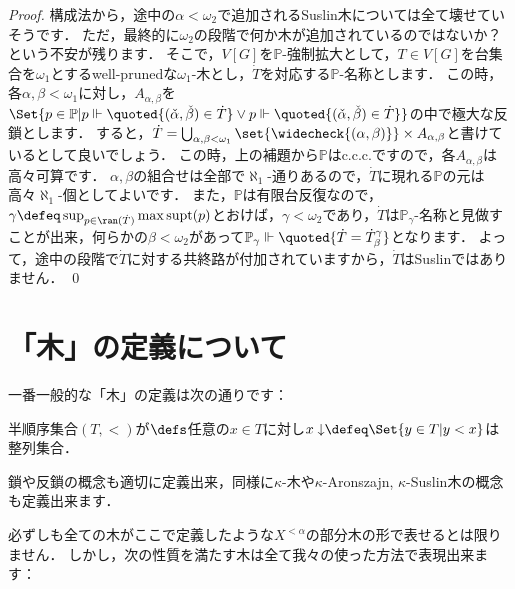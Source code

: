 \documentclass[a4j]{ltjsarticle}
\renewcommand{\emph}[1]{\textsf{\textgt{#1}}}
\begin{document}
\begin{proof}
 構成法から，途中の$\alpha < \omega_2$で追加されるSuslin木については全て壊せていそうです．
 ただ，最終的に$\omega_2$の段階で何か木が追加されているのではないか？という不安が残ります．
 そこで，$V[G]$を$\mathbb{P}$-強制拡大として，$T \in V[G]$を台集合を$\omega_1$とするwell-prunedな$\omega_1$-木とし，$\dot{T}$を対応する$\mathbb{P}$-名称とします．
 この時，各$\alpha, \beta < \omega_1$に対し，$A_{\alpha,\beta}$を$\Set{p \in \mathbb{P} | p \Vdash \quoted{(\check{\alpha}, \check{\beta}) \in \dot{T}} \lor p \Vdash \quoted{(\check{\alpha}, \check{\beta}) \in \dot{T}}}$の中で極大な反鎖とします．
 すると，$\dot{T} = \bigcup_{\alpha, \beta < \omega_1} \set{\widecheck{(\alpha, \beta)}} \times A_{\alpha,\beta}$と書けているとして良いでしょう．
 この時，上の補題から$\mathbb{P}$はc.c.c.ですので，各$A_{\alpha,\beta}$は高々可算です．
 $\alpha, \beta$の組合せは全部で$\aleph_1$-通りあるので，$\dot{T}$に現れる$\mathbb{P}$の元は高々$\aleph_1$-個としてよいです．
 また，$\mathbb{P}$は有限台反復なので，$\gamma \defeq \sup_{p \in \ran(\dot{T})} \max \mathop{\mathrm{supt}}(p)$とおけば，$\gamma < \omega_2$であり，$\dot{T}$は$\mathbb{P}_\gamma$-名称と見做すことが出来，何らかの$\beta < \omega_2$があって$\mathbb{P}_\gamma \Vdash \quoted{\dot{T} = \dot{T}^\gamma_\beta}$となります．
 よって，途中の段階で$\dot{T}$に対する共終路が付加されていますから，$\dot{T}$はSuslinではありません． \qed
\end{proof}

\section*{「木」の定義について}
一番一般的な「木」の定義は次の通りです：
\begin{definition}
 半順序集合$(T, <)$が\emph{木}$\defs$任意の$x \in T$に対し$\mathord{x\downarrow} \defeq \Set{y \in T | y < x}$は整列集合．
\end{definition}

鎖や反鎖の概念も適切に定義出来，同様に$\kappa$-木や$\kappa$-Aronszajn, $\kappa$-Suslin木の概念も定義出来ます．

必ずしも全ての木がここで定義したような$X^{<\alpha}$の部分木の形で表せるとは限りません．
しかし，次の性質を満たす木は全て我々の使った方法で表現出来ます：
\end{document}
